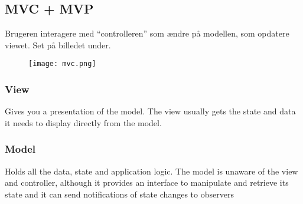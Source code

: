 \documentclass[../SWD_disp.tex]{subfiles}
\begin{document}
\subsection{MVC + MVP}
Brugeren interagere med ``controlleren'' som ændre på modellen, som opdatere viewet. Set på billedet under.
\begin{figure}[H]
	\centering
	\texttt{[image: mvc.png]}
\end{figure}


\subsubsection*{View}
Gives you a presentation of the model. The view usually gets the state and data it needs to display directly from the model.  
\subsubsection*{Model}
Holds all the data, state and application logic. The model is unaware of the view and controller, although it provides an interface to manipulate and retrieve its state and it can send notifications of state changes to observers 
\end{document}
